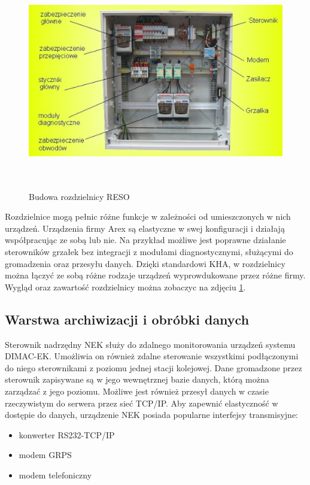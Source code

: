 \begin{figure}[t]
	\includegraphics[height=95mm]{./img/dimacek_rozdzielnica.png}
	\caption{Budowa rozdzielnicy RESO}
	\label{fig:dimacek-reso}
\end{figure}

Rozdzielnice mogą pełnic różne funkcje w zależności od umieszczonych w nich urządzeń. Urządzenia firmy Arex są elastyczne w swej konfiguracji i działają współpracując ze sobą lub nie. Na przykład możliwe jest poprawne działanie sterowników grzałek bez integracji z modułami diagnostycznymi, służącymi do gromadzenia oraz przesyłu danych. Dzięki standardowi KHA, w rozdzielnicy można łączyć ze sobą różne rodzaje urządzeń wyprowdukowane przez różne firmy. Wygląd oraz zawartość rozdzielnicy można zobaczyc na zdjęciu \ref{fig:dimacek-reso}.

\subsection{Warstwa archiwizacji i obróbki danych}
Sterownik nadrzędny NEK służy do zdalnego monitorowania urządzeń systemu DIMAC-EK. Umożliwia on również zdalne sterowanie wszystkimi podłączonymi do niego sterownikami z poziomu jednej stacji kolejowej. Dane gromadzone przez sterownik zapisywane są w jego wewnętrznej bazie danych, którą można zarządzać z jego poziomu. Możliwe jest również przesył danych w czasie rzeczywistym do serwera przez sieć TCP/IP. Aby zapewnić elastyczność w dostępie do danych, urządzenie NEK posiada popularne interfejsy transmisyjne:
\begin{itemize}
\item konwerter RS232-TCP/IP
\item modem GRPS
\item modem telefoniczny
\end{itemize}

